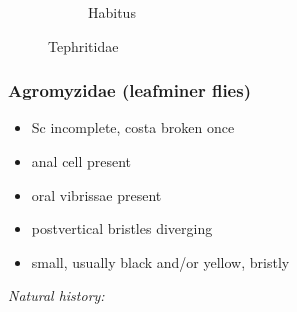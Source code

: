 \documentclass[letterpaper, 11pt]{article}
\begin{document}
\begin{figure}[ht!]
\begin{subfigure}[ht!]{0.4\textwidth}
        \caption{Habitus \citep[][Fig. 66.1]{mcalpine1981manualv2}}
        \label{fig:tephritid2}
    \end{subfigure}
    \caption{Tephritidae}\label{fig:tephritids}
\end{figure}

\subsubsection{Agromyzidae (leafminer flies)}
\begin{itemize}
\item Sc incomplete, costa broken once
\item anal cell present
\item oral vibrissae present
\item postvertical bristles diverging
\item small, usually black and/or yellow, bristly
\end{itemize}

\noindent{}\textit{Natural history:} \\
\end{document}
